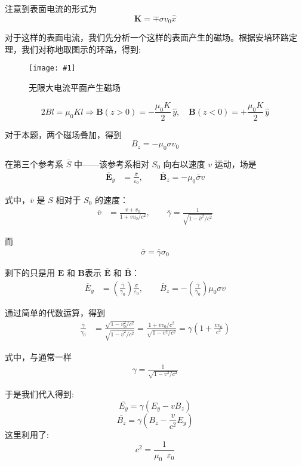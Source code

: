 \documentclass[12pt,a4paper,oneside]{report}
\theoremstyle{definition}
\theoremstyle{remark}
\newcommand{\insertfig}[3]{
    \begin{figure}[ht]
        \centering
        \texttt{[image: \#1]}
        \caption{#2}
        \label{fig:#1}
    \end{figure}
}
\renewcommand{\v}{\mathop{}\!\varepsilon}
\begin{document}
注意到表面电流的形式为
\[
\mathbf K = \mp \sigma v_0 \hat x 
\]

对于这样的表面电流，我们先分析一个这样的表面产生的磁场。根据安培环路定理，我们对称地取图示的环路，得到:

\insertfig{5-9.png}{无限大电流平面产生磁场}{0.5}
\[
2Bl = \mu_0Kl \Rightarrow\mathbf B(z>0)=-\dfrac{\mu_0 K}{2}\,\hat y,\quad \mathbf B(z<0)=+\dfrac{\mu_0 K}{2}\,\hat y
\]

对于本题，两个磁场叠加，得到
\[
B_z = -\mu_0 \sigma v_0 
\]

在第三个参考系 $\overline{S}$ 中——该参考系相对 $S_0$ 向右以速度 $v$ 运动，场是
\begin{align*}
\overline{\mathbf E}_y &= \frac{\overline{\sigma}}{\varepsilon_0}, \qquad 
\overline{\mathbf B}_z = -\mu_0 \overline{\sigma} v 
\end{align*}

式中，$\overline v$ 是 $S$ 相对于 $S_0$ 的速度：
\begin{align*}
\overline v &= \frac{v + v_0}{1 + v v_0 / c^2}, 
\qquad 
\overline{\gamma} = \frac{1}{\sqrt{1 - \overline v^2 / c^2}} 
\end{align*}

而
\begin{align*}
\overline \sigma = \overline \gamma \sigma_0 
\end{align*}

剩下的只是用 $\mathbf E$ 和 $\mathbf B$表示
$\overline{\mathbf E}$ 和 $\overline{\mathbf B}$：
\begin{align*}
\overline E_y &= \left(\frac{\overline{\gamma}}{\gamma_0}\right)\frac{\sigma}{\varepsilon_0}, 
\qquad 
\overline B_z = -\left(\frac{\overline{\gamma}}{\gamma_0}\right)\mu_0 \sigma v 
\end{align*}

通过简单的代数运算，得到
\begin{align*}
\frac{\overline{\gamma}}{\gamma_0} 
&= \frac{\sqrt{1 - v_0^2 / c^2}}{\sqrt{1 - \overline v^2 / c^2}}
   = \frac{1 + v v_0 / c^2}{\sqrt{1 - v^2 / c^2}} 
   = \gamma \left( 1 + \frac{v v_0}{c^2} \right) 
\end{align*}

式中，与通常一样
\begin{align*}
\gamma = \frac{1}{\sqrt{1 - v^2 / c^2}} 
\end{align*}

于是我们代入得到:
\[
\overline{E_y} = \gamma(E_y-vB_z)
\]
\[
\overline{B_z} = \gamma(B_z-\frac{v}{c^2}E_y)
\]
这里利用了:
\[
c^2 = \frac{1}{\mu_0\v_0}
\]
\end{document}
